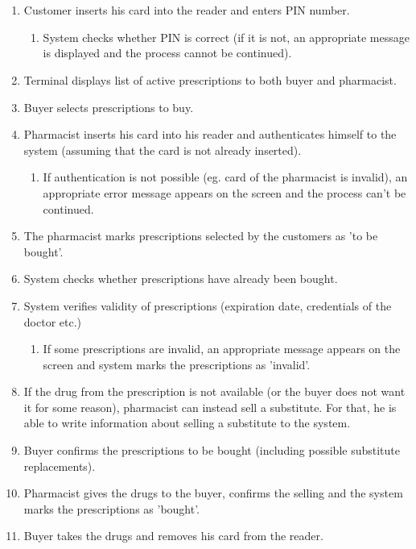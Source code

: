 \section{}

\begin{enumerate}
  \item Customer inserts his card into the reader and enters PIN number.
  \begin{enumerate}
	\item System checks whether PIN is correct (if it is not, an appropriate message is displayed and the process cannot be continued).
  \end{enumerate}
  \item Terminal displays list of active prescriptions to both buyer and pharmacist.
  \item Buyer selects prescriptions to buy.
  \item Pharmacist inserts his card into his reader and authenticates himself to the system (assuming that the card is not already inserted).
  \begin{enumerate}
	\item  If authentication is not possible (eg. card of the pharmacist is invalid), an appropriate error message appears on the screen and the process can't be continued.
  \end{enumerate}
  \item The pharmacist marks prescriptions selected by the customers as 'to be bought'.
  \item System checks whether prescriptions have already been bought.
  \item System verifies validity of prescriptions (expiration date, credentials of the doctor etc.)
 \begin{enumerate}
	\item If some prescriptions are invalid, an appropriate message appears on the screen and system marks the prescriptions as 'invalid'.
  \end{enumerate}
  \item  If the drug from the prescription is not available (or the buyer does not want it for some reason), pharmacist can instead sell a substitute. For that, he is able to write information about selling a substitute to the system.
  \item Buyer confirms the prescriptions to be bought (including possible substitute replacements).
  \item Pharmacist gives the drugs to the buyer, confirms the selling and the system marks the prescriptions as 'bought'.
  \item  Buyer takes the drugs and removes his card from the reader.
\end{enumerate}

